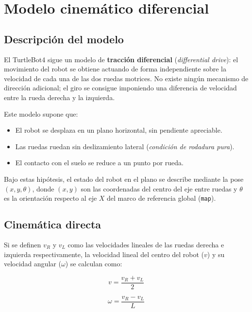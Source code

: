 \section{Modelo cinemático diferencial}

\subsection{Descripción del modelo}

El TurtleBot4 sigue un modelo de \textbf{tracción diferencial} (\textit{differential drive})\cite{siegwart2011robotics}: el movimiento del robot se obtiene actuando de forma independiente sobre la velocidad de cada una de las dos ruedas motrices. No existe ningún mecanismo de dirección adicional; el giro se consigue imponiendo una diferencia de velocidad entre la rueda derecha y la izquierda.

Este modelo supone que:

\begin{itemize}
    \item El robot se desplaza en un plano horizontal, sin pendiente apreciable.
    \item Las ruedas ruedan sin deslizamiento lateral (\textit{condición de rodadura pura}).
    \item El contacto con el suelo se reduce a un punto por rueda.
\end{itemize}

Bajo estas hipótesis, el estado del robot en el plano se describe mediante la pose $(x, y, \theta)$, donde $(x, y)$ son las coordenadas del centro del eje entre ruedas y $\theta$ es la orientación respecto al eje $X$ del marco de referencia global (\texttt{map}).

\subsection{Cinemática directa}

Si se definen $v_R$ y $v_L$ como las velocidades lineales de las ruedas derecha e izquierda respectivamente, la velocidad lineal del centro del robot ($v$) y su velocidad angular ($\omega$) se calculan como:

\begin{equation}
    v = \frac{v_R + v_L}{2}
    \label{eq:vel_lineal}
\end{equation}

\begin{equation}
    \omega = \frac{v_R - v_L}{L}
    \label{eq:vel_angular}
\end{equation}

